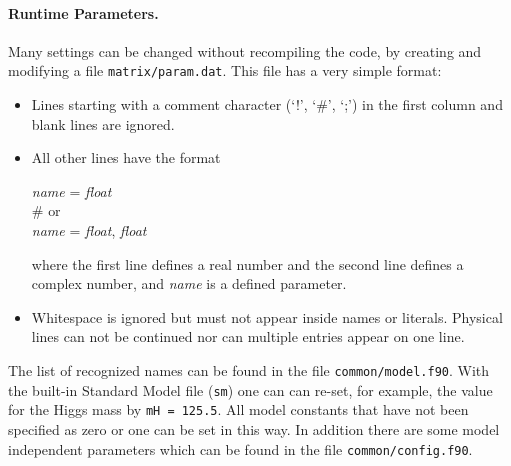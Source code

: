 \documentclass[11pt,a4paper]{refrep}
\begin{document}
\paragraph{Runtime Parameters.}
Many settings can be changed without recompiling the code, by
creating and modifying a file \texttt{matrix/param.dat}.
This file has a very simple format:
\begin{itemize}
\item Lines starting with a comment character (`!', `\#', `;')
      in the first column and blank lines are ignored.
\item All other lines have the format
\begin{example}
\textit{name} = \textit{float}\\
\# \textrm{or}\\
\textit{name} = \textit{float}, \textit{float}
\end{example}
      where the first line defines a real number and the second
      line defines a complex number, and \textit{name} is a defined
      parameter.
\item Whitespace is ignored but must not appear inside names or
      literals. Physical lines can not be continued nor can
      multiple entries appear on one line.
\end{itemize}
The list of recognized names can be found in the file
\texttt{common/model.f90}. 
With the built-in Standard Model file (\texttt{sm}) one
can can re-set, for example, the value for the Higgs mass by 
{\tt mH = 125.5}.
All model constants that have not been specified as zero or one
can be set in this way. 
In addition there are some model independent parameters which can be found in the file 
\texttt{common/config.f90}.
\end{document}
